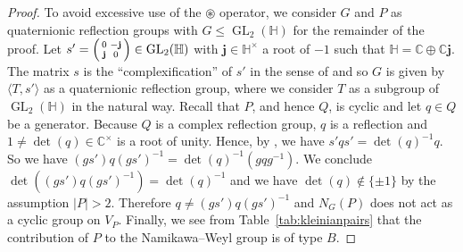 \documentclass[a4paper]{amsart}
\theoremstyle{plain}
\theoremstyle{definition}
\theoremstyle{remark}
\DeclareMathOperator{\GL}{GL}
\newcommand{\CC}{\mathbb C}
\newcommand{\HH}{\mathbb H}
\begin{document}
\begin{proof}
  To avoid excessive use of the \(\circledast\) operator, we consider \(G\) and \(P\) as quaternionic reflection groups with \(G\leqslant \GL_2(\HH)\) for the remainder of the proof.
  Let \(s' = \begin{psmallmatrix} 0 & -\mathbf j\\ \mathbf j & 0\end{psmallmatrix}\in \GL_2(\HH)\) with \(\mathbf j\in \HH^\times\) a root of \(-1\) such that \(\HH = \CC \oplus \CC\mathbf j\).
  The matrix \(s\) is the \enquote{complexification} of \(s'\) in the sense of \cite[p.~294]{Coh80} and so \(G\) is given by \(\langle T, s'\rangle\) as a quaternionic reflection group, where we consider \(T\) as a subgroup of \(\GL_2(\HH)\) in the natural way.
  Recall that \(P\), and hence \(Q\), is cyclic and let \(q\in Q\) be a generator.
  Because \(Q\) is a complex reflection group, \(q\) is a reflection and \(1 \neq \det(q)\in \CC^\times\) is a root of unity.
  Hence, by \cite[Lem.~4.5]{RS26}, we have \(s'q s' = \det(q)^{-1} q\).
  So we have \((gs') q (gs')^{-1} = \det(q)^{-1}(gqg^{-1})\).
  We conclude \(\det((gs')q(gs')^{-1}) = \det(q)^{-1}\) and we have \(\det(q)\notin\{\pm 1\}\) by the assumption \(|{P}| > 2\).
  Therefore \(q\neq(gs') q (gs')^{-1}\) and \(N_G(P)\) does not act as a cyclic group on \(V_P\).
  Finally, we see from Table~\ref{tab:kleinianpairs} that the contribution of \(P\) to the Namikawa--Weyl group is of type \(B\).
\end{proof}
\end{document}
